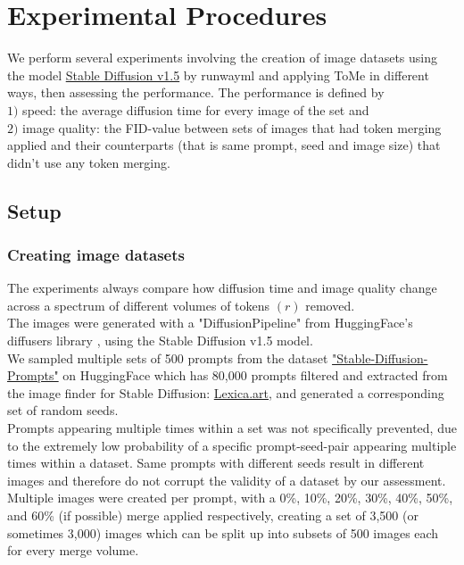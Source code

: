 \section{Experimental Procedures} \label{experiments}
We perform several experiments involving the creation of image datasets using the model \href{https://huggingface.co/runwayml/stable-diffusion-v1-5}{Stable Diffusion v1.5} by runwayml \cite{Rombach_2022_CVPR} and applying ToMe in different ways, then assessing the performance.
The performance is defined by\\ 
\(1)\) speed: the average diffusion time for every image of the set and\\
\(2)\) image quality: the FID-value between sets of images that had token merging applied and their counterparts (that is same prompt, seed and image size) that didn't use any token merging.



\subsection{Setup}
\subsubsection*{Creating image datasets}
The experiments always compare how diffusion time and image quality change across a spectrum of different volumes of tokens \((r)\) removed.\\
The images were generated with a "DiffusionPipeline" from HuggingFace's diffusers library \cite{von-platen-etal-2022-diffusers}, using the Stable Diffusion v1.5 model.\\
We sampled multiple sets of 500 prompts from the dataset \href{https://huggingface.co/datasets/Gustavosta/Stable-Diffusion-Prompts}{"Stable-Diffusion-Prompts"} on HuggingFace which has 80,000 prompts filtered and extracted from the image finder for Stable Diffusion: \href{https://lexica.art}{Lexica.art}, and generated a corresponding set of random seeds.\\ 
Prompts appearing multiple times within a set was not specifically prevented, due to the extremely low probability of a specific prompt-seed-pair appearing multiple times within a dataset. Same prompts with different seeds result in different images and therefore do not corrupt the validity of a dataset by our assessment.\\
Multiple images were created per prompt, with a 0\%, 10\%, 20\%, 30\%, 40\%, 50\%, and 60\% (if possible) merge applied respectively, creating a set of 3,500 (or sometimes 3,000) images which can be split up into subsets of 500 images each for every merge volume.\\



